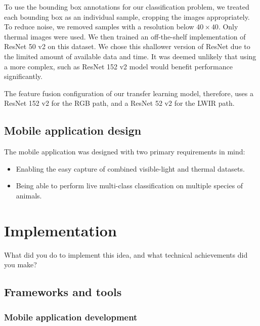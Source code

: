 \documentclass{l4proj}
\begin{document}
To use the bounding box annotations for our classification problem, we treated each bounding box as an individual sample, cropping the images appropriately. To reduce noise, we removed samples with a resolution below $40 \times 40$. Only thermal images were used. We then trained an off-the-shelf implementation of ResNet 50 v2 on this dataset. We chose this shallower version of ResNet due to the limited amount of available data and time. It was deemed unlikely that using a more complex, such as ResNet 152 v2 model would benefit performance significantly.

The feature fusion configuration of our transfer learning model, therefore, uses a ResNet 152 v2 for the RGB path, and a ResNet 52 v2 for the LWIR path.


\section{Mobile application design}

The mobile application was designed with two primary requirements in mind:

\begin{itemize}
  \item Enabling the easy capture of combined visible-light and thermal datasets.
  \item Being able to perform live multi-class classification on multiple species of animals.
\end{itemize}



\chapter{Implementation}
What did you do to implement this idea, and what technical achievements did you make?

\section{Frameworks and tools}

\subsection{Mobile application development}
\end{document}
